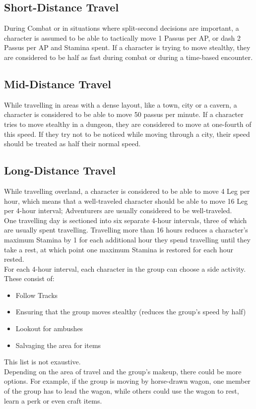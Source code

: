 \subsection{Short-Distance Travel}
During Combat or in situations where split-second decisions are important, a character is assumed to be able to tactically move 1 Passus per AP, or dash 2 Passus per AP and Stamina spent. If a character is trying to move stealthy, they are considered to be half as fast during combat or during a time-based encounter.\\

\subsection{Mid-Distance Travel}
While travelling in areas with a dense layout, like a town, city or a cavern, a character is considered to be able to move 50 passus per minute. If a character tries to move stealthy in a dungeon, they are considered to move at one-fourth of this speed. If they try not to be noticed while moving through a city, their speed should be treated as half their normal speed.\\

\subsection{Long-Distance Travel}
While travelling overland, a character is considered to be able to move 4 Leg per hour, which means that a well-traveled character should be able to move 16 Leg per 4-hour interval; Adventurers are usually considered to be well-traveled.\\

One travelling day is sectioned into six separate 4-hour intervals, three of which are usually spent travelling. Travelling more than 16 hours reduces a character's maximum Stamina by 1 for each additional hour they spend travelling until they take a rest, at which point one maximum Stamina is restored for each hour rested.\\

For each 4-hour interval, each character in the group can choose a side activity. These consist of:
\begin{itemize}
	\item Follow Tracks
	
	\item Ensuring that the group moves stealthy (reduces the group's speed by half)
	
	\item Lookout for ambushes
	
	\item Salvaging the area for items
	
\end{itemize}
This list is not exaustive.\\

Depending on the area of travel and the group's makeup, there could be more options. For example, if the group is moving by horse-drawn wagon, one member of the group has to lead the wagon, while others could use the wagon to rest, learn a perk or even craft items.

